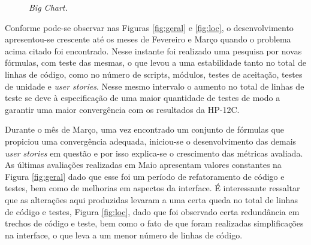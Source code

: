 \begin{figure}[!h]
 \caption{\it Big Chart.} \label{fig:bigchart}
\end{figure}

Conforme pode-se observar nas Figuras \ref{fig:geral} e \ref{fig:loc}, o desenvolvimento apresentou-se crescente até os meses de Fevereiro e Março quando o problema acima citado foi encontrado. Nesse instante foi realizado uma pesquisa por novas fórmulas, com teste das mesmas, o que levou a uma estabilidade tanto no total de linhas de código, como no número de scripts, módulos, testes de aceitação, testes de unidade e \textit{user stories}. Nesse mesmo intervalo o aumento no total de linhas de teste se deve à especificação de uma maior quantidade de testes de modo a garantir uma maior convergência com os resultados da HP-12C.

Durante o mês de Março, uma vez encontrado um conjunto de fórmulas que propiciou uma convergência adequada, iniciou-se o desenvolvimento das demais \textit{user stories} em questão e por isso explica-se o crescimento das métricas avaliada. As últimas avaliações realizadas em Maio apresentam valores constantes na Figura \ref{fig:geral} dado que esse foi um período de refatoramento de código e testes, bem como de melhorias em aspectos da interface. É interessante ressaltar que as alterações aqui produzidas levaram a uma certa queda no total de linhas de código e testes, Figura \ref{fig:loc}, dado que foi observado certa redundância em trechos de código e teste, bem como o fato de que foram realizadas simplificações na interface, o que leva a um menor número de linhas de código.

